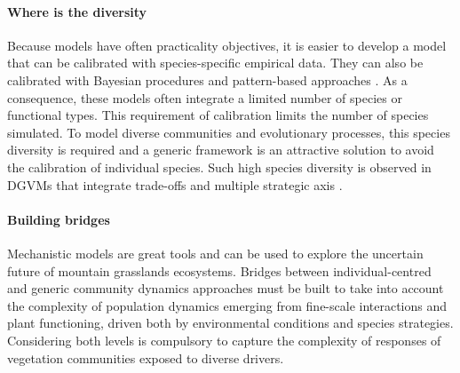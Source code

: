 \paragraph{Where is the diversity}
Because models have often practicality objectives, it is easier to develop a model that can be calibrated with species-specific empirical data. They can also be calibrated with Bayesian procedures and pattern-based approaches \cite{hartig_statistical_2011}. As a consequence, these models often integrate a limited number of species or functional types. This requirement of calibration limits the number of species simulated. To model diverse communities and evolutionary processes, this species diversity is required and a generic framework is an attractive solution to avoid the calibration of individual species. Such high species diversity is observed in DGVMs that integrate trade-offs and multiple strategic axis \parencite{kleidon_global_2000, pavlick_jena_2013}.

\paragraph{Building bridges}
Mechanistic models are great tools and can be used to explore the uncertain future of mountain grasslands ecosystems. Bridges between individual-centred and generic community dynamics approaches must be built to take into account the complexity of population dynamics emerging from fine-scale interactions and plant functioning, driven both by environmental conditions and species strategies. Considering both levels is compulsory to capture the complexity of responses of vegetation communities exposed to diverse drivers.

%
%
%

